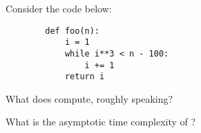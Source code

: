 \begin{prob}
    Consider the code below:

    \begin{verbatim}
        def foo(n):
            i = 1
            while i**3 < n - 100:
                i += 1
            return i
    \end{verbatim}

    \begin{subprobset}
        \begin{subprob}
            What does  compute, roughly speaking?

            \begin{soln}
            
            \end{soln}
        \end{subprob}

        \begin{subprob}
            What is the asymptotic time complexity of ?

            \begin{soln}
            
            \end{soln}
        \end{subprob}
    \end{subprobset}

\end{prob}

